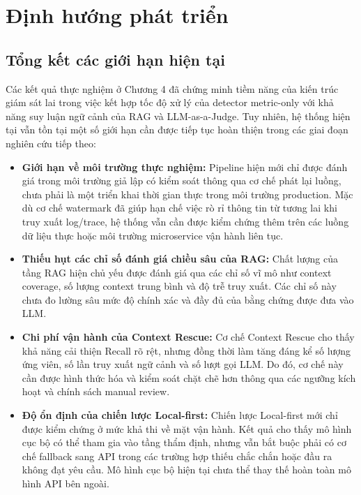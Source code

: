 \section{Định hướng phát triển}

\subsection{Tổng kết các giới hạn hiện tại}

Các kết quả thực nghiệm ở Chương 4 đã chứng minh tiềm năng của kiến trúc giám sát lai trong việc kết hợp tốc độ xử lý của detector metric-only với khả năng suy luận ngữ cảnh của RAG và LLM-as-a-Judge. Tuy nhiên, hệ thống hiện tại vẫn tồn tại một số giới hạn cần được tiếp tục hoàn thiện trong các giai đoạn nghiên cứu tiếp theo:

\begin{itemize}
    \item \textbf{Giới hạn về môi trường thực nghiệm:} Pipeline hiện mới chỉ được đánh giá trong môi trường giả lập có kiểm soát thông qua cơ chế phát lại luồng, chưa phải là một triển khai thời gian thực trong môi trường production. Mặc dù cơ chế watermark đã giúp hạn chế việc rò rỉ thông tin từ tương lai khi truy xuất log/trace, hệ thống vẫn cần được kiểm chứng thêm trên các luồng dữ liệu thực hoặc môi trường microservice vận hành liên tục.
    \item \textbf{Thiếu hụt các chỉ số đánh giá chiều sâu của RAG:} Chất lượng của tầng RAG hiện chủ yếu được đánh giá qua các chỉ số vĩ mô như context coverage, số lượng context trung bình và độ trễ truy xuất. Các chỉ số này chưa đo lường sâu mức độ chính xác và đầy đủ của bằng chứng được đưa vào LLM.
    \item \textbf{Chi phí vận hành của Context Rescue:} Cơ chế Context Rescue cho thấy khả năng cải thiện Recall rõ rệt, nhưng đồng thời làm tăng đáng kể số lượng ứng viên, số lần truy xuất ngữ cảnh và số lượt gọi LLM. Do đó, cơ chế này cần được hình thức hóa và kiểm soát chặt chẽ hơn thông qua các ngưỡng kích hoạt và chính sách manual review.
    \item \textbf{Độ ổn định của chiến lược Local-first:} Chiến lược Local-first mới chỉ được kiểm chứng ở mức khả thi về mặt vận hành. Kết quả cho thấy mô hình cục bộ có thể tham gia vào tầng thẩm định, nhưng vẫn bắt buộc phải có cơ chế fallback sang API trong các trường hợp thiếu chắc chắn hoặc đầu ra không đạt yêu cầu. Mô hình cục bộ hiện tại chưa thể thay thế hoàn toàn mô hình API bên ngoài.
\end{itemize}

